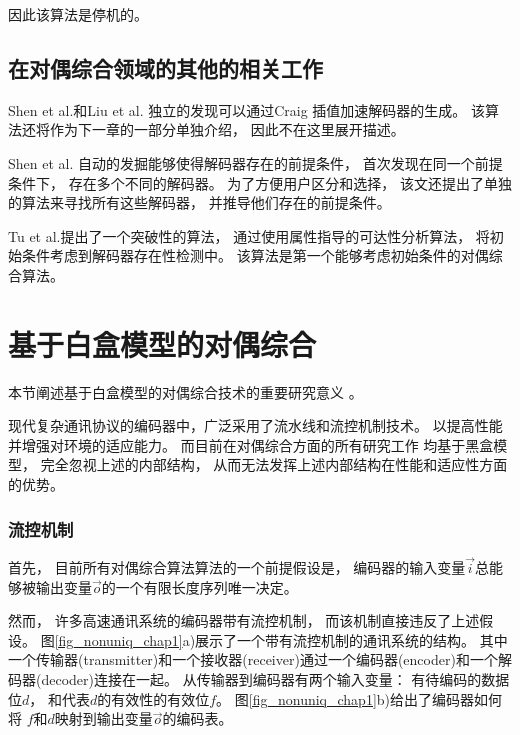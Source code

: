 因此该算法是停机的。



\subsection{在对偶综合领域的其他的相关工作}

Shen et al.和Liu et al. 独立的发现可以通过Craig 插值加速解码器的生成。
该算法还将作为下一章的一部分单独介绍，
因此不在这里展开描述。

Shen et al. 自动的发掘能够使得解码器存在的前提条件，
首次发现在同一个前提条件下，
存在多个不同的解码器。
为了方便用户区分和选择，
该文还提出了单独的算法来寻找所有这些解码器，
并推导他们存在的前提条件。

Tu et al.提出了一个突破性的算法，
通过使用属性指导的可达性分析算法，
将初始条件考虑到解码器存在性检测中。
该算法是第一个能够考虑初始条件的对偶综合算法。




\section{基于白盒模型的对偶综合}\label{sec_whiteboxtodo}
本节阐述基于白盒模型的对偶综合技术的重要研究意义
。




现代复杂通讯协议的编码器中，广泛采用了流水线和流控机制技术。
以提高性能并增强对环境的适应能力。
而目前在对偶综合方面的所有研究工作
均基于黑盒模型，
完全忽视上述的内部结构，
从而无法发挥上述内部结构在性能和适应性方面的优势。

\subsubsection{流控机制}
首先，
目前所有对偶综合算法算法的一个前提假设是，
编码器的输入变量$\vec{i}$总能够被输出变量$\vec{o}$的一个有限长度序列唯一决定。

然而，
许多高速通讯系统的编码器带有流控机制，
而该机制直接违反了上述假设。
图\ref{fig_nonuniq_chap1}a)展示了一个带有流控机制的通讯系统的结构。
其中一个传输器(transmitter)和一个接收器(receiver)通过一个编码器(encoder)和一个解码器(decoder)连接在一起。
从传输器到编码器有两个输入变量：
有待编码的数据位$d$，
和代表$d$的有效性的有效位$f$。
图\ref{fig_nonuniq_chap1}b)给出了编码器如何将
$f$和$d$映射到输出变量$\vec{o}$的编码表。

